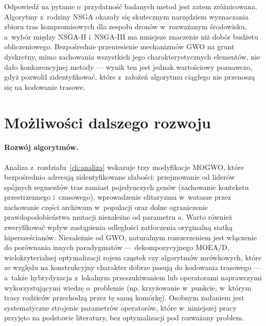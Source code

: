 Odpowiedź na pytanie o~przydatność badanych metod jest zatem zróżnicowana.
Algorytmy z~rodziny NSGA okazały się skutecznym narzędziem wyznaczania zbioru
tras kompromisowych dla zespołu dronów w~rozważanym środowisku, a~wybór między
NSGA-II i~NSGA-III ma mniejsze znaczenie niż dobór budżetu obliczeniowego.
Bezpośrednie przeniesienie mechanizmów GWO na grunt dyskretny, mimo zachowania
wszystkich jego charakterystycznych elementów, nie dało konkurencyjnej metody
--- wynik ten jest jednak wartościowy poznawczo, gdyż pozwolił zidentyfikować,
które z~założeń algorytmu ciągłego nie przenoszą się na kodowanie trasowe.

\section{Możliwości dalszego rozwoju}
\label{sec:podsumowanie_rozwoj}

\paragraph{Rozwój algorytmów.}
Analiza z~rozdziału~\ref{ch:analiza} wskazuje trzy modyfikacje MOGWO, które
bezpośrednio adresują zidentyfikowane słabości: przejmowanie od liderów spójnych
segmentów tras zamiast pojedynczych genów (zachowanie kontekstu przestrzennego
i~czasowego), wprowadzenie elitaryzmu w~watasze przez zachowanie części archiwum
w~populacji oraz dolne ograniczenie prawdopodobieństwa mutacji niezależne od
parametru $a$. Warto również zweryfikować wpływ zastąpienia odległości zatłoczenia
oryginalną siatką hipersześcianów. Niezależnie od GWO, naturalnym rozszerzeniem
jest włączenie do porównania innych paradygmatów --- dekompozycyjnego MOEA/D,
wielokryterialnej optymalizacji rojem cząstek czy algorytmów mrówkowych,
które ze względu na konstrukcyjny charakter dobrze pasują do kodowania trasowego
--- a~także hybrydyzacja z~lokalnym przeszukiwaniem lub operatorami naprawczymi
wykorzystującymi wiedzę o~problemie (np. krzyżowanie w~punkcie, w~którym trasy
rodziców przechodzą przez tę samą komórkę). Osobnym zadaniem jest systematyczne
strojenie parametrów operatorów, które w~niniejszej pracy przyjęto na podstawie
literatury, bez optymalizacji pod rozważany problem.

